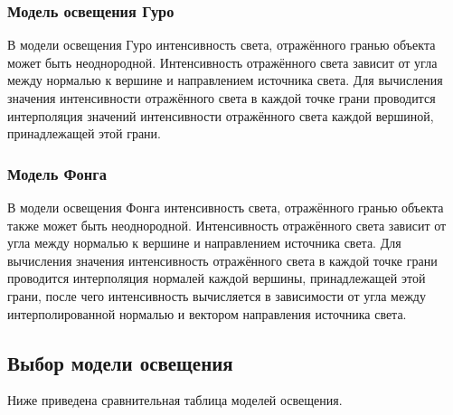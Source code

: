 \subsubsection{Модель освещения Гуро}

В модели освещения Гуро интенсивность света, отражённого гранью объекта может быть неоднородной.
Интенсивность отражённого света зависит от угла между нормалью к вершине и направлением источника света.
Для вычисления значения интенсивности отражённого света в каждой точке грани проводится интерполяция значений интенсивности отражённого света каждой вершиной, принадлежащей этой грани.

\subsubsection{Модель Фонга}

В модели освещения Фонга интенсивность света, отражённого гранью объекта также может быть неоднородной.
Интенсивность отражённого света зависит от угла между нормалью к вершине и направлением источника света.
Для вычисления значения интенсивность отражённого света в каждой точке грани проводится интерполяция нормалей каждой вершины, принадлежащей этой грани, после чего интенсивность вычисляется в зависимости от угла между интерполированной нормалью и вектором направления источника света.

\subsection*{Выбор модели освещения}

Ниже приведена сравнительная таблица моделей освещения.

